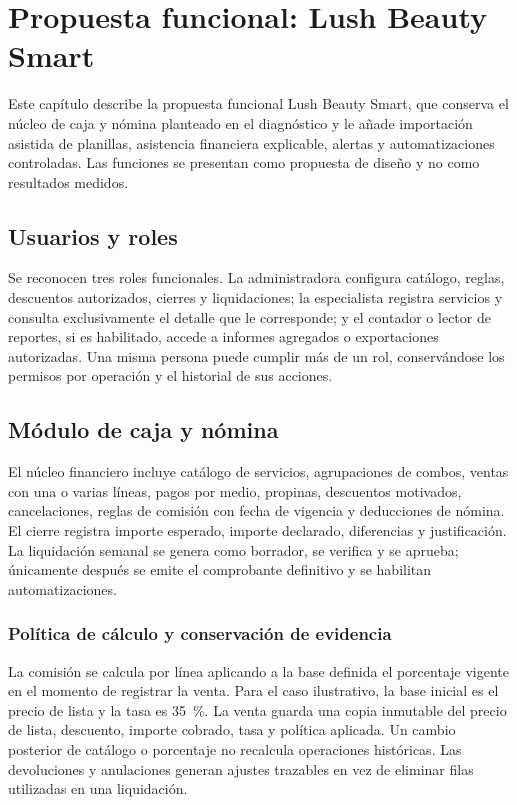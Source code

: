 \section{Propuesta funcional: Lush Beauty Smart}\label{cap:propuesta}

Este capítulo describe la propuesta funcional Lush Beauty Smart, que conserva el núcleo de caja y nómina planteado en el diagnóstico y le añade importación asistida de planillas, asistencia financiera explicable, alertas y automatizaciones controladas. Las funciones se presentan como propuesta de diseño y no como resultados medidos.

\subsection{Usuarios y roles}

Se reconocen tres roles funcionales. La administradora configura catálogo, reglas, descuentos autorizados, cierres y liquidaciones; la especialista registra servicios y consulta exclusivamente el detalle que le corresponde; y el contador o lector de reportes, si es habilitado, accede a informes agregados o exportaciones autorizadas. Una misma persona puede cumplir más de un rol, conservándose los permisos por operación y el historial de sus acciones.


\subsection{Módulo de caja y nómina}

El núcleo financiero incluye catálogo de servicios, agrupaciones de combos, ventas con una o varias líneas, pagos por medio, propinas, descuentos motivados, cancelaciones, reglas de comisión con fecha de vigencia y deducciones de nómina. El cierre registra importe esperado, importe declarado, diferencias y justificación. La liquidación semanal se genera como borrador, se verifica y se aprueba; únicamente después se emite el comprobante definitivo y se habilitan automatizaciones.


\subsubsection{Política de cálculo y conservación de evidencia}

La comisión se calcula por línea aplicando a la base definida el porcentaje vigente en el momento de registrar la venta. Para el caso ilustrativo, la base inicial es el precio de lista y la tasa es 35~\%. La venta guarda una copia inmutable del precio de lista, descuento, importe cobrado, tasa y política aplicada. Un cambio posterior de catálogo o porcentaje no recalcula operaciones históricas. Las devoluciones y anulaciones generan ajustes trazables en vez de eliminar filas utilizadas en una liquidación.



